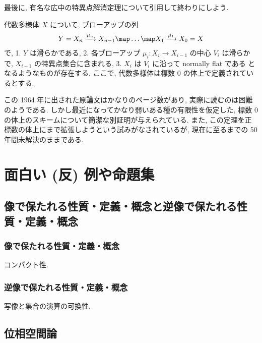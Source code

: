 \documentclass[openany, a4paper, oneside]{jsbook}
\begin{document}
最後に, 有名な広中の特異点解消定理について引用して終わりにしよう.
\begin{thm}[広中の定理]
 代数多様体 $X$ について, ブローアップの列
 \begin{align}
  Y
  =
  X_n
  \xrightarrow{\mu_n}
  X_{n-1} \map \dots \map X_1 \xrightarrow{\mu_1} X_0
  =
  X
 \end{align}
 で,
 1. $Y$ は滑らかである,
 2. 各ブローアップ $\mu_i : X_i \to X_{i-1}$ の中心 $V_i$ は滑らかで,  $X_{i-1}$ の特異点集合に含まれる,
 3. $X_i$ は $V_i$ に沿って normally flat である
 となるようなものが存在する.
 ここで, 代数多様体は標数 $0$ の体上で定義されているとする. \fin
\end{thm}
この 1964 年に出された原論文はかなりのページ数があり, 実際に読むのは困難のようである.
しかし最近になってかなり弱いある種の有限性を仮定した, 標数 $0$ の体上のスキームについて簡潔な別証明が与えられている\cite{MichaelTemkin1}.
また, この定理を正標数の体上にまで拡張しようという試みがなされているが, 現在に至るまでの 50 年間未解決のままである.
\part{面白い (反) 例や命題集}

\chapter{像で保たれる性質・定義・概念と逆像で保たれる性質・定義・概念}

\section{像で保たれる性質・定義・概念}

コンパクト性.
\section{逆像で保たれる性質・定義・概念}

写像と集合の演算の可換性.
\chapter{位相空間論}
\end{document}
